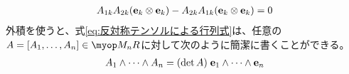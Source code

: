 {	\begin{equation*}\begin{split}
		A_{1k}A_{2k}({\mathbf{e}}_k\otimes{\mathbf{e}}_k) - A_{2k}A_{1k}({\mathbf{e}}_k\otimes{\mathbf{e}}_k)
		= 0
	\end{split}\end{equation*}
	外積を使うと、式\eqref{eq:反対称テンソルによる行列式}は、任意の
	$A=[A_1,\dots,A_n]\in \Mat_nR$に対して次のように簡潔に書くことができる。
	\begin{equation}\label{eq:外積による行列式}\begin{split}
		A_1\wedge\cdots\wedge A_n = (\det A)\;{\mathbf{e}}_1\wedge\cdots\wedge {\mathbf{e}}_n
	\end{split}\end{equation}
%
}\endgroup %
